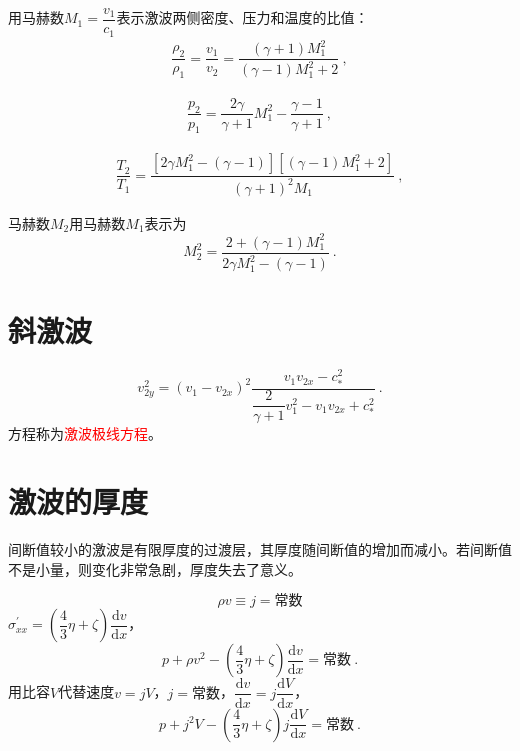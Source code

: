 \documentclass[12pt,a4paper]{article}
\newcommand{\dif}{\mathrm{d}}
\begin{document}
用马赫数$M_1 = \dfrac{v_1}{c_1}$表示激波两侧密度、压力和温度的比值：
\begin{align}
 \dfrac{\rho_2}{\rho_1} =  \dfrac{v_1}{v_2} = \dfrac{(\gamma+1)M_1^2}{(\gamma-1)M_1^2 +2} ~,
\end{align}

\begin{align}
 \dfrac{p_2}{p_1} =  \dfrac{2\gamma}{\gamma +1} M_1^2 - \dfrac{\gamma-1}{\gamma+1} ~,
\end{align}


\begin{align}
 \dfrac{T_2}{T_1} =  \dfrac{[2\gamma M_1^2 - (\gamma -1)][(\gamma -1)M_1^2 +2]}{(\gamma+1)^2M_1} ~,
\end{align}


马赫数$M_2$用马赫数$M_1$表示为
\begin{equation}
M_2^2 = \dfrac{2 +(\gamma-1)M_1^2 }{2\gamma M_1^2 -(\gamma-1)} ~.
\end{equation}









\section{斜激波}















\begin{equation}
v_{2y}^2 = (v_1 -v_{2x})^2 \dfrac{v_1 v_{2x} -c_\ast^2}{\dfrac{2}{\gamma+1} v_1^2 -v_1 v_{2x} +c_\ast^2} ~.
\end{equation}
方程称为\textcolor{red}{激波极线方程}。





\section{激波的厚度}
间断值较小的激波是有限厚度的过渡层，其厚度随间断值的增加而减小。若间断值不是小量，则变化非常急剧，厚度失去了意义。

\begin{equation}
\rho v \equiv j = \text{常数}
\end{equation}
$\sigma_{xx}^\prime = \left(\dfrac{4}{3} \eta +\zeta \right) \dfrac{\dif v}{\dif x}$，
\begin{equation*}
p + \rho v^2- \left(\dfrac{4}{3} \eta +\zeta \right) \dfrac{\dif v}{\dif x} = \text{常数} ~.
\end{equation*}
用比容$V$代替速度$v = j V$，$j = \text{常数}$，$\dfrac{\dif v}{\dif x} = j \dfrac{\dif V}{\dif x}$，
\begin{equation*}
p + j^2 V - \left(\dfrac{4}{3} \eta +\zeta \right) j \dfrac{\dif V}{\dif x} = \text{常数} ~.
\end{equation*}
\end{document}
